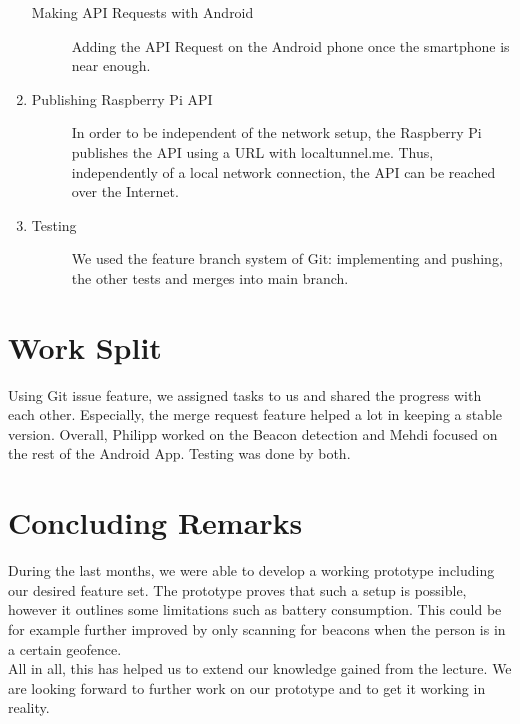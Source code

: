 \documentclass[
10pt, %
a4paper, %
oneside, %
headinclude,footinclude, %
BCOR5mm, %
]{scrartcl}
\begin{document}
\begin{enumerate}
\begin{description}
		\item[Making API Requests with Android] Adding the API Request on the Android phone once the smartphone is near enough.
	\end{description}
		\item 
		\begin{description}
		\item[Publishing Raspberry Pi API] In order to be independent of the network setup, the Raspberry Pi publishes the API using a URL with localtunnel.me. Thus, independently of a local network connection, the API can be reached over the Internet.
	\end{description}
	\item
	\begin{description}
		\item[Testing] We used the feature branch system of Git: implementing and pushing, the other tests and merges into main branch.
	\end{description}
\end{enumerate}

\section{Work Split}

Using Git issue feature, we assigned tasks to us and shared the progress with each other. Especially, the merge request feature helped a lot in keeping a stable version. Overall, Philipp worked on the Beacon detection and Mehdi focused on the rest of the Android App. Testing was done by both.


\section{Concluding Remarks}
During the last months, we were able to develop a working prototype including our desired feature set. The prototype proves that such a setup is possible, however it outlines some limitations such as battery consumption. This could be for example further improved by only scanning for beacons when the person is in a certain geofence.\\
All in all, this has helped us to extend our knowledge gained from the lecture. We are looking forward to further work on our prototype and to get it working in reality.



\renewcommand{\refname}{\spacedlowsmallcaps{References}} %




\end{document}
